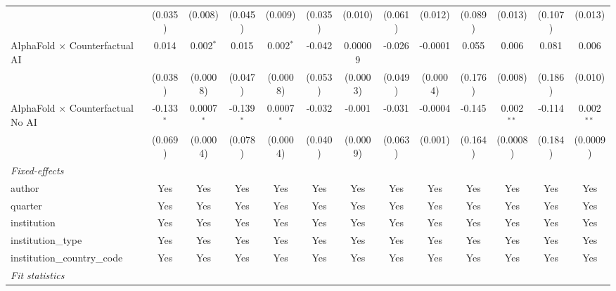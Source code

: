 \begin{tabular}{lcccccccccccc}
                                            & (0.035)      & (0.008)        & (0.045)       & (0.009)       & (0.035) & (0.010)  & (0.061) & (0.012)  & (0.089)       & (0.013)        & (0.107)      & (0.013)\\   
   AlphaFold $\times$ Counterfactual AI     & 0.014        & 0.002$^{*}$    & 0.015         & 0.002$^{*}$   & -0.042  & 0.00009  & -0.026  & -0.0001  & 0.055         & 0.006          & 0.081        & 0.006\\   
                                            & (0.038)      & (0.0008)       & (0.047)       & (0.0008)      & (0.053) & (0.0003) & (0.049) & (0.0004) & (0.176)       & (0.008)        & (0.186)      & (0.010)\\   
   AlphaFold $\times$ Counterfactual No AI  & -0.133$^{*}$ & 0.0007$^{*}$   & -0.139$^{*}$  & 0.0007$^{*}$  & -0.032  & -0.001   & -0.031  & -0.0004  & -0.145        & 0.002$^{**}$   & -0.114       & 0.002$^{**}$\\   
                                            & (0.069)      & (0.0004)       & (0.078)       & (0.0004)      & (0.040) & (0.0009) & (0.063) & (0.001)  & (0.164)       & (0.0008)       & (0.184)      & (0.0009)\\   
   \midrule
   \emph{Fixed-effects}\\
   author                                   & Yes          & Yes            & Yes           & Yes           & Yes     & Yes      & Yes     & Yes      & Yes           & Yes            & Yes          & Yes\\  
   quarter                                  & Yes          & Yes            & Yes           & Yes           & Yes     & Yes      & Yes     & Yes      & Yes           & Yes            & Yes          & Yes\\  
   institution                              & Yes          & Yes            & Yes           & Yes           & Yes     & Yes      & Yes     & Yes      & Yes           & Yes            & Yes          & Yes\\  
   institution\_type                        & Yes          & Yes            & Yes           & Yes           & Yes     & Yes      & Yes     & Yes      & Yes           & Yes            & Yes          & Yes\\  
   institution\_country\_code               & Yes          & Yes            & Yes           & Yes           & Yes     & Yes      & Yes     & Yes      & Yes           & Yes            & Yes          & Yes\\  
   \midrule
   \emph{Fit statistics}\\

\end{tabular}
